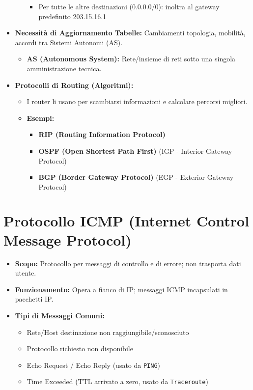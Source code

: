 \begin{itemize}
\begin{itemize}
\begin{itemize}
            \item Per tutte le altre destinazioni (0.0.0.0/0): inoltra al gateway predefinito 203.15.16.1
        \end{itemize}
    \end{itemize}
    \item \textbf{Necessità di Aggiornamento Tabelle:} Cambiamenti topologia, mobilità, accordi tra Sistemi Autonomi (AS).
    \begin{itemize}
        \item \textbf{AS (Autonomous System):} Rete/insieme di reti sotto una singola amministrazione tecnica.
    \end{itemize}
    \item \textbf{Protocolli di Routing (Algoritmi):}
    \begin{itemize}
        \item I router li usano per scambiarsi informazioni e calcolare percorsi migliori.
        \item \textbf{Esempi:}
        \begin{itemize}
            \item \textbf{RIP (Routing Information Protocol)}
            \item \textbf{OSPF (Open Shortest Path First)} (IGP - Interior Gateway Protocol)
            \item \textbf{BGP (Border Gateway Protocol)} (EGP - Exterior Gateway Protocol)
        \end{itemize}
    \end{itemize}
\end{itemize}

\section{Protocollo ICMP (Internet Control Message Protocol)}
\begin{itemize}
    \item \textbf{Scopo:} Protocollo per messaggi di controllo e di errore; non trasporta dati utente.
    \item \textbf{Funzionamento:} Opera a fianco di IP; messaggi ICMP incapsulati in pacchetti IP.
    \item \textbf{Tipi di Messaggi Comuni:}
    \begin{itemize}
        \item Rete/Host destinazione non raggiungibile/sconosciuto
        \item Protocollo richiesto non disponibile
        \item Echo Request / Echo Reply (usato da \texttt{PING})
        \item Time Exceeded (TTL arrivato a zero, usato da \texttt{Traceroute})
    \end{itemize}
\end{itemize}

